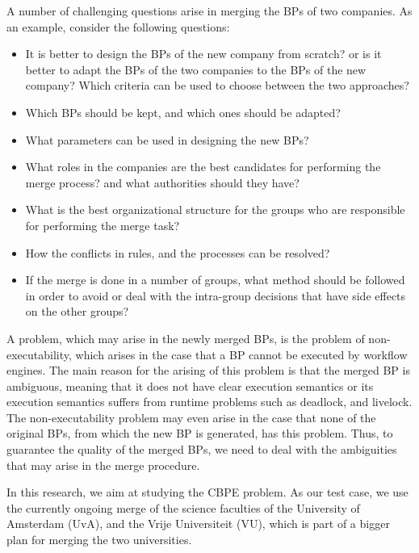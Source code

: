 \documentclass{article}
\begin{document}
A number of challenging questions arise in merging the BPs of two companies.
As an example, consider the following questions:
\begin{itemize}
  \item It is better to design the BPs of the new company from scratch? or is it better to adapt the BPs of the two companies to the BPs of the new company? Which criteria can be used to choose between the two approaches?
  \item Which BPs should be kept, and which ones should be adapted?
  \item What parameters can be used in designing the new BPs?
  \item What roles in the companies are the best candidates for performing the merge process? and what authorities should they have?
  \item What is the best organizational structure for the groups who are responsible for performing the merge task?
  \item How the conflicts in rules, and the processes can be resolved?
  \item If the merge is done in a number of groups, what method should be followed in order to avoid or deal with the intra-group decisions that have side effects on the other groups?
\end{itemize}




A problem, which may arise in the newly merged BPs, is the problem of non-executability, which arises in the case that a BP cannot be executed by workflow engines.
The main reason for the arising of this problem is that the merged BP is ambiguous, meaning that it does not have clear execution semantics or its execution semantics suffers from runtime problems such as deadlock, and livelock.
The non-executability problem may even arise in the case that none of the original BPs, from which the new BP is generated, has this problem.
Thus, to guarantee the quality of the merged BPs, we need to deal with the ambiguities that may arise in the merge procedure.


In this research, we aim at studying the CBPE problem.
As our test case, we use the currently ongoing merge of the science faculties of the University of Amsterdam (UvA), and the Vrije Universiteit (VU), which is part of a bigger plan for merging the two universities.
\end{document}

